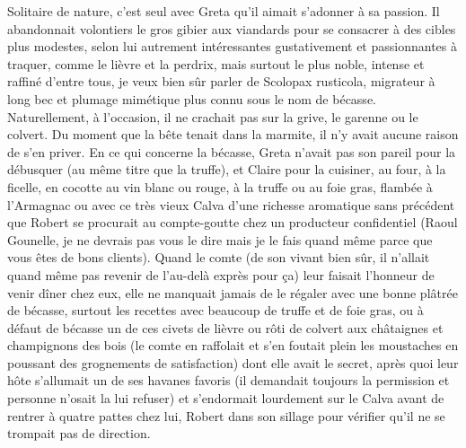 Solitaire de nature, c’est seul avec Greta qu’il aimait s’adonner à sa passion. Il abandonnait volontiers le gros gibier aux viandards pour se consacrer à des cibles plus modestes, selon lui autrement intéressantes gustativement et passionnantes à traquer, comme le lièvre et la perdrix, mais surtout le plus noble, intense et raffiné d’entre tous, je veux bien sûr parler de Scolopax rusticola, migrateur à long bec et plumage mimétique plus connu sous le nom de bécasse. Naturellement, à l’occasion, il ne crachait pas sur la grive, le garenne ou le colvert. Du moment que la bête tenait dans la marmite, il n’y avait aucune raison de s’en priver. En ce qui concerne la bécasse, Greta n’avait pas son pareil pour la débusquer (au même titre que la truffe), et Claire pour la cuisiner, au four, à la ficelle, en cocotte au vin blanc ou rouge, à la truffe ou au foie gras, flambée à l’Armagnac ou avec ce très vieux Calva d’une richesse aromatique sans précédent que Robert se procurait au compte-goutte chez un producteur confidentiel (Raoul Gounelle, je ne devrais pas vous le dire mais je le fais quand même parce que vous êtes de bons clients). Quand le comte (de son vivant bien sûr, il n’allait quand même pas revenir de l’au-delà exprès pour ça) leur faisait l’honneur de venir dîner chez eux, elle ne manquait jamais de le régaler avec une bonne plâtrée de bécasse, surtout les recettes avec beaucoup de truffe et de foie gras, ou à défaut de bécasse un de ces civets de lièvre ou rôti de colvert aux châtaignes et champignons des bois (le comte en raffolait et s’en foutait plein les moustaches en poussant des grognements de satisfaction) dont elle avait le secret, après quoi leur hôte s’allumait un de ses havanes favoris (il demandait toujours la permission et personne n’osait la lui refuser) et s’endormait lourdement sur le Calva avant de rentrer à quatre pattes chez lui, Robert dans son sillage pour vérifier qu’il ne se trompait pas de direction.

